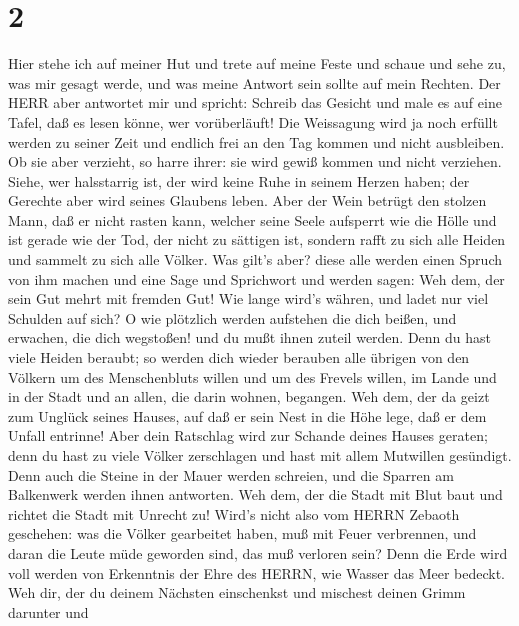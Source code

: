 \hypertarget{section-1}{%
\section{2}\label{section-1}}

 Hier stehe ich auf meiner Hut und trete auf meine Feste und
schaue und sehe zu, was mir gesagt werde, und was meine Antwort sein
sollte auf mein Rechten.  Der HERR aber antwortet mir und
spricht: Schreib das Gesicht und male es auf eine Tafel, daß es lesen
könne, wer vorüberläuft!  Die Weissagung wird ja noch
erfüllt werden zu seiner Zeit und endlich frei an den Tag kommen und
nicht ausbleiben. Ob sie aber verzieht, so harre ihrer: sie wird gewiß
kommen und nicht verziehen.  Siehe, wer halsstarrig ist, der
wird keine Ruhe in seinem Herzen haben; der Gerechte aber wird seines
Glaubens leben.  Aber der Wein betrügt den stolzen Mann, daß
er nicht rasten kann, welcher seine Seele aufsperrt wie die Hölle und
ist gerade wie der Tod, der nicht zu sättigen ist, sondern rafft zu sich
alle Heiden und sammelt zu sich alle Völker.  Was gilt's
aber? diese alle werden einen Spruch von ihm machen und eine Sage und
Sprichwort und werden sagen: Weh dem, der sein Gut mehrt mit fremden
Gut! Wie lange wird's währen, und ladet nur viel Schulden auf sich?
 O wie plötzlich werden aufstehen die dich beißen, und
erwachen, die dich wegstoßen! und du mußt ihnen zuteil werden.
 Denn du hast viele Heiden beraubt; so werden dich wieder
berauben alle übrigen von den Völkern um des Menschenbluts willen und um
des Frevels willen, im Lande und in der Stadt und an allen, die darin
wohnen, begangen.  Weh dem, der da geizt zum Unglück seines
Hauses, auf daß er sein Nest in die Höhe lege, daß er dem Unfall
entrinne!  Aber dein Ratschlag wird zur Schande deines
Hauses geraten; denn du hast zu viele Völker zerschlagen und hast mit
allem Mutwillen gesündigt.  Denn auch die Steine in der
Mauer werden schreien, und die Sparren am Balkenwerk werden ihnen
antworten.  Weh dem, der die Stadt mit Blut baut und
richtet die Stadt mit Unrecht zu!  Wird's nicht also vom
HERRN Zebaoth geschehen: was die Völker gearbeitet haben, muß mit Feuer
verbrennen, und daran die Leute müde geworden sind, das muß verloren
sein?  Denn die Erde wird voll werden von Erkenntnis der
Ehre des HERRN, wie Wasser das Meer bedeckt.  Weh dir, der
du deinem Nächsten einschenkst und mischest deinen Grimm darunter und

